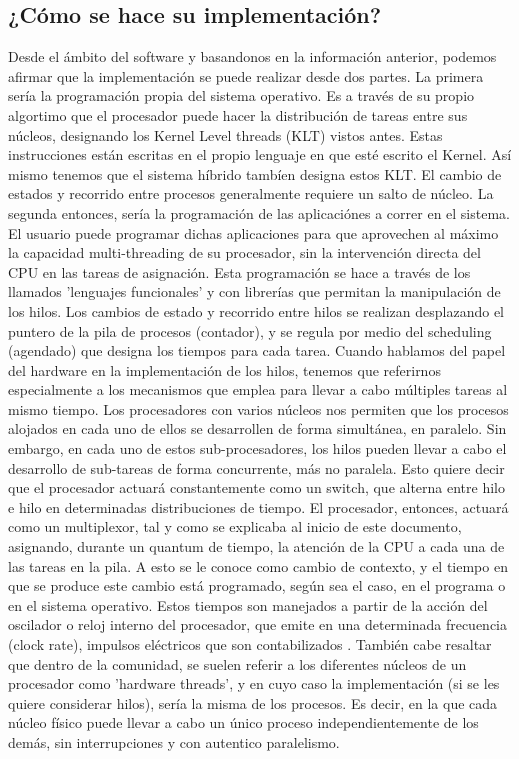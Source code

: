 \documentclass[12pt]{article}
\begin{document}
\begin{multicols}{2}
\subsection*{¿Cómo se hace su implementación?}
\indent Desde el ámbito del software y basandonos en la información anterior, podemos afirmar que la implementación se puede realizar desde dos partes. La primera sería la programación propia del sistema operativo. Es a través de su propio algortimo que el procesador puede hacer la distribución de tareas entre sus núcleos, designando los Kernel Level threads (KLT) vistos antes. Estas instrucciones están escritas en el propio lenguaje en que esté escrito el Kernel. Así mismo tenemos que el sistema híbrido tambíen designa estos KLT. El cambio de estados y recorrido entre procesos generalmente requiere un salto de núcleo. La segunda entonces, sería la programación de las aplicaciónes a correr en el sistema. El usuario puede programar dichas aplicaciones para que aprovechen al máximo la capacidad multi-threading de su procesador, sin la intervención directa del CPU en las tareas de asignación. Esta programación se hace a través de los llamados 'lenguajes funcionales' y con librerías que permitan la manipulación de los hilos. Los cambios de estado y recorrido entre hilos se realizan desplazando el puntero de la pila de procesos (contador), y se regula por medio del scheduling (agendado) que designa los tiempos para cada tarea.\cite{Res}
Cuando hablamos del papel del hardware en la implementación de los hilos, tenemos que referirnos especialmente a los mecanismos que emplea para llevar a cabo múltiples tareas al mismo tiempo. Los procesadores con varios núcleos nos permiten que los procesos alojados en cada uno de ellos se desarrollen de forma simultánea, en paralelo. Sin embargo, en cada uno de estos sub-procesadores, los hilos pueden llevar a cabo el desarrollo de sub-tareas de forma concurrente, más no paralela. Esto quiere decir que el procesador actuará constantemente como un switch, que alterna entre hilo e hilo en determinadas distribuciones de tiempo. El procesador, entonces, actuará como un multiplexor, tal y como se explicaba al inicio de este documento, asignando, durante un quantum de tiempo, la atención de la CPU a cada una de las tareas en la pila. A esto se le conoce como cambio de contexto, y el tiempo en que se produce este cambio está programado, según sea el caso, en el programa o en el sistema operativo. Estos tiempos son manejados a partir de la acción del oscilador o reloj interno del procesador, que emite en una determinada frecuencia (clock rate), impulsos eléctricos que son contabilizados \cite{Bre}. También cabe resaltar que dentro de la comunidad, se suelen referir a los diferentes núcleos de un procesador como 'hardware threads', y en cuyo caso la implementación (si se les quiere considerar hilos), sería la misma de los procesos.  Es decir, en la que cada núcleo físico puede llevar a cabo un único proceso independientemente de los demás, sin interrupciones y con autentico paralelismo.

\end{multicols}
\end{document}
